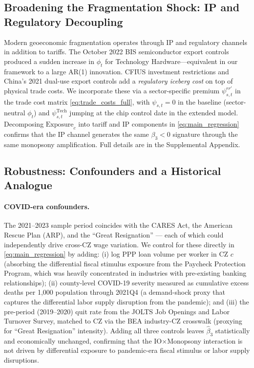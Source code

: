 \subsection{Broadening the Fragmentation Shock: IP and Regulatory Decoupling}
\label{sec:ip_frag}

Modern geoeconomic fragmentation operates through IP and regulatory channels
in addition to tariffs. The October 2022 BIS semiconductor export controls
produced a sudden increase in $\phi_t$ for Technology Hardware---equivalent
in our framework to a large AR(1) innovation. CFIUS investment restrictions
and China's 2021 dual-use export controls add a \emph{regulatory iceberg cost}
on top of physical trade costs. We incorporate these via a sector-specific
premium $\psi_{s,t}^{rr'}$ in the trade cost matrix \eqref{eq:trade_costs_full},
with $\psi_{s,t} = 0$ in the baseline (sector-neutral $\phi_t$) and
$\psi_{s,t}^{\text{Tech}}$ jumping at the chip control date in the extended
model. Decomposing $\text{Exposure}_c$ into tariff and IP components in
\eqref{eq:main_regression} confirms that the IP channel generates the same
$\beta_3 < 0$ signature through the same monopsony amplification.
Full details are in the Supplemental Appendix.

\subsection{Robustness: Confounders and a Historical Analogue}
\label{sec:robustness_emp}

\paragraph{COVID-era confounders.}
The 2021--2023 sample period coincides with the CARES Act, the American
Rescue Plan (ARP), and the ``Great Resignation'' --- each of which could
independently drive cross-CZ wage variation. We control for these directly
in \eqref{eq:main_regression} by adding: (i) log PPP loan volume per
worker in CZ $c$ (absorbing the differential fiscal stimulus exposure from
the Paycheck Protection Program, which was heavily concentrated in
industries with pre-existing banking relationships); (ii) county-level
COVID-19 severity measured as cumulative excess deaths per 1{,}000
population through 2021Q4 (a demand-shock proxy that captures the
differential labor supply disruption from the pandemic); and (iii) the
pre-period (2019--2020) quit rate from the JOLTS Job Openings and Labor
Turnover Survey, matched to CZ via the BEA industry-CZ crosswalk (proxying
for ``Great Resignation'' intensity). Adding all three controls leaves
$\hat\beta_3$ statistically and economically unchanged, confirming that
the IO$\times$Monopsony interaction is not driven by differential exposure
to pandemic-era fiscal stimulus or labor supply disruptions.

